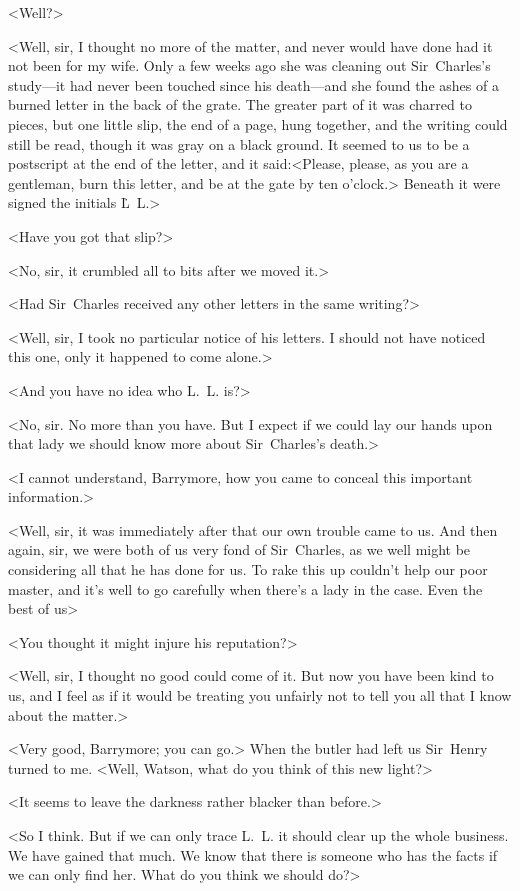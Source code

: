 <Well?>


<Well, sir, I thought no more of the matter, and never would have done had it not been for my wife. Only a few weeks ago she was cleaning out Sir~Charles's study—it had never been touched since his death—and she found the ashes of a burned letter in the back of the grate. The greater part of it was charred to pieces, but one little slip, the end of a page, hung together, and the writing could still be read, though it was gray on a black ground. It seemed to us to be a postscript at the end of the letter, and it said:<Please, please, as you are a gentleman, burn this letter, and be at the gate by ten o'clock.> Beneath it were signed the initials L\.~L\@.>

<Have you got that slip?>

<No, sir, it crumbled all to bits after we moved it.>

<Had Sir~Charles received any other letters in the same writing?>

<Well, sir, I took no particular notice of his letters. I should not have noticed this one, only it happened to come alone.>

<And you have no idea who L\@.~L\@. is?>

<No, sir. No more than you have. But I expect if we could lay our hands upon that lady we should know more about Sir~Charles's death.>

<I cannot understand, Barrymore, how you came to conceal this important information.>

<Well, sir, it was immediately after that our own trouble came to us. And then again, sir, we were both of us very fond of Sir~Charles, as we well might be considering all that he has done for us. To rake this up couldn't help our poor master, and it's well to go carefully when there's a lady in the case. Even the best of us\longdash>

<You thought it might injure his reputation?>

<Well, sir, I thought no good could come of it. But now you have been kind to us, and I feel as if it would be treating you unfairly not to tell you all that I know about the matter.>

<Very good, Barrymore; you can go.> When the butler had left us Sir~Henry turned to me. <Well, Watson, what do you think of this new light?>

<It seems to leave the darkness rather blacker than before.>

<So I think. But if we can only trace L\@.~L\@. it should clear up the whole business. We have gained that much. We know that there is someone who has the facts if we can only find her. What do you think we should do?>

